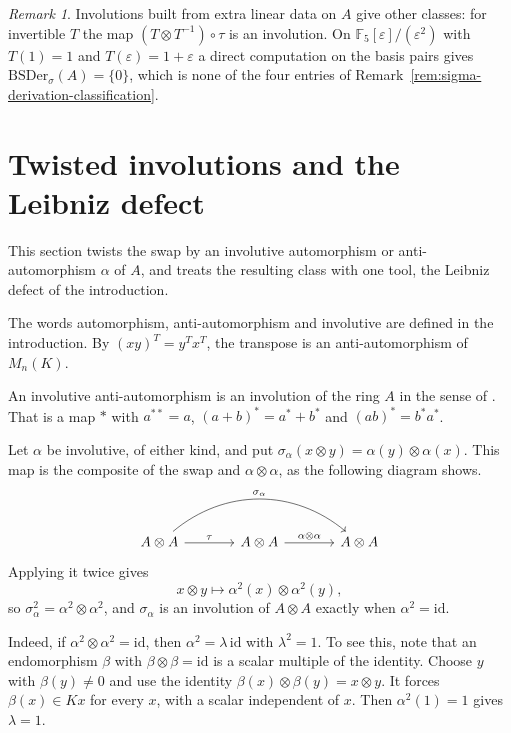 \documentclass[]{interact}
\theoremstyle{plain}
\theoremstyle{definition}
\theoremstyle{remark}
\newtheorem{remark}[theorem]{Remark}
\newcommand{\BSDer}{\mathrm{BSDer}}
\begin{document}
\begin{remark}
Involutions built from extra linear data on $A$ give other classes: for invertible $T$ the map $(T \otimes T^{-1}) \circ \tau$ is an involution. On $\mathbb{F}_5[\varepsilon]/(\varepsilon^2)$ with $T(1) = 1$ and $T(\varepsilon) = 1 + \varepsilon$ a direct computation on the basis pairs gives $\BSDer_\sigma(A) = \{0\}$, which is none of the four entries of Remark~\ref{rem:sigma-derivation-classification}. %
\end{remark}

\section{Twisted involutions and the Leibniz defect}\label{sec:twisted}

This section twists the swap by an involutive automorphism or anti-automorphism $\alpha$ of $A$, and treats the resulting class with one tool, the Leibniz defect of the introduction.

The words automorphism, anti-automorphism and involutive are defined in the introduction. %
By $(xy)^{T} = y^{T}x^{T}$, the transpose is an anti-automorphism of $M_n(K)$.

An involutive anti-automorphism is an involution of the ring $A$ in the sense of \citet[\S1.2]{Herstein1976}.
That is a map $*$ with $a^{**} = a$, $(a+b)^* = a^* + b^*$ and $(ab)^* = b^*a^*$.

Let $\alpha$ be involutive, of either kind, and put $\sigma_\alpha(x \otimes y) = \alpha(y) \otimes \alpha(x)$.
This map is the composite of the swap and $\alpha \otimes \alpha$, as the following diagram shows.
\[
\begin{tikzcd}[column sep=large]
A \otimes A \arrow[r, "\tau"] \arrow[rr, bend left=40, "\sigma_\alpha"] & A \otimes A \arrow[r, "\alpha \otimes \alpha"] & A \otimes A
\end{tikzcd}
\]
Applying it twice gives
\[
x \otimes y \mapsto \alpha^2(x) \otimes \alpha^2(y),
\]
so $\sigma_\alpha^2 = \alpha^2 \otimes \alpha^2$, and $\sigma_\alpha$ is an involution of $A \otimes A$ exactly when $\alpha^2 = \mathrm{id}$.

Indeed, if $\alpha^2 \otimes \alpha^2 = \mathrm{id}$, then $\alpha^2 = \lambda\,\mathrm{id}$ with $\lambda^2 = 1$.
To see this, note that an endomorphism $\beta$ with $\beta \otimes \beta = \mathrm{id}$ is a scalar multiple of the identity.
Choose $y$ with $\beta(y) \ne 0$ and use the identity $\beta(x) \otimes \beta(y) = x \otimes y$. It forces $\beta(x) \in Kx$ for every $x$, with a scalar independent of $x$. %
Then $\alpha^2(1) = 1$ gives $\lambda = 1$.
\end{document}
